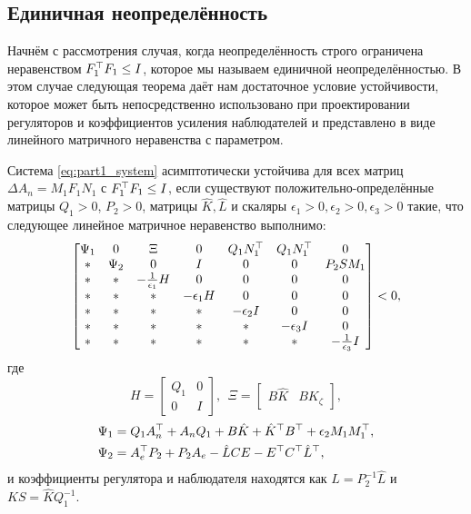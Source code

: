 \subsection{Единичная неопределённость}\label{sec:ch3/sect3/sub1}

Начнём с рассмотрения случая, когда неопределённость строго ограничена неравенством ${F}_1^\top{F}_1\leq {I}$, которое мы называем единичной неопределённостью. В этом случае следующая теорема даёт нам достаточное условие устойчивости, которое может быть непосредственно использовано при проектировании регуляторов и коэффициентов усиления наблюдателей и представлено в виде линейного матричного неравенства с параметром.
\begin{theorem}\label{thm:part1_LMI_1}
	Система \eqref{eq:part1_system} асимптотически устойчива для всех матриц $\Delta {A}_n={M}_1{F}_1{N}_1$ с ${F}_1^\top{F}_1\leq {I}$, если существуют положительно-определённые матрицы ${Q}_1>0$, ${P}_2>0$, матрицы $\hat{{K}}, \hat{{L}}$ и скаляры $\epsilon_1>0,\epsilon_2>0,\epsilon_3>0$ такие, что следующее линейное матричное неравенство выполнимо: 
	\begin{equation}
		\label{eq:thm1_main_LMI}
		\begin{bmatrix}    
			{\Psi}_1  & 0 & {\Xi} & 0 &  {Q}_1{N}_1^\top & {Q}_1{N}_1^\top & 0\\
			* & {\Psi}_2 & 0 & {I} & 0 & 0 & {P}_2{S}{M}_1\\
			* & * &  -\frac{1}{\epsilon_1}{H} & 0 & 0 &0 & 0\\
			* & * & * & -\epsilon_1{H} & 0 & 0 & 0 \\
			* & * & * & * & -\epsilon_2 {I} & 0 & 0 \\       * & * & * & * & *& -\epsilon_3 {I} & 0 \\
			* & * & * & * & *& * & -\frac{1}{\epsilon_3} {I}
		\end{bmatrix} <0,
	\end{equation}
	где
	\begin{equation}
		\label{eq:H_Xi_variables}
		{H} = \begin{bmatrix}
			{Q}_1 & 0 \\
			0 & {I}
		\end{bmatrix}, \ \ 
		{\Xi} = \begin{bmatrix}
			{B}\hat{{K}} & {B}{K}_{\zeta} \end{bmatrix},
	\end{equation}
	\begin{align}
		\label{eq:Psi_1}
		{\Psi}_1&={Q}_1{A}_n^\top+{A}_n{Q}_1+{B}\hat{{K}}+\hat{{K}}^\top{B}^\top  +\epsilon_2{M}_1{M}_1^\top, \\
		\label{eq:Psi_2}
		{\Psi}_2 &={A}_e^\top{P}_2+{P}_2{A}_e-\hat{{L}}{CE}-{E}^\top{C}^\top\hat{{L}}^\top,
	\end{align}
	и коэффициенты регулятора и наблюдателя находятся как ${L}={P}^{-1}_2\hat{{L}}$
	и ${KS}=\hat{{K}}{Q}^{-1}_1$.  
\end{theorem}

